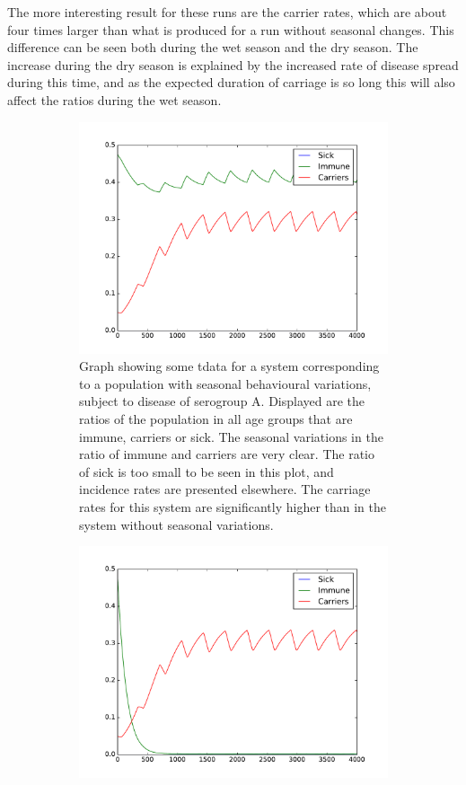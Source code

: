 \documentclass[10pt,a4paper]{article}
\begin{document}
The more interesting result for these runs are the carrier rates, which are about four times larger than what is produced for a run without seasonal changes. This difference can be seen both during the wet season and the dry season. The increase during the dry season is explained by the increased rate of disease spread during this time, and as the expected duration of carriage is so long this will also affect the ratios during the wet season.

\begin{figure}
	\centering
	\begin{subfigure}{0.45\textwidth}
		\includegraphics[width=\textwidth]{figures/disease_endemic_2pop_A}
		\caption{Graph showing some tdata for a system corresponding to a population with seasonal behavioural variations, subject to disease of serogroup A. Displayed are the ratios of the population in all age groups that are immune, carriers or sick. The seasonal variations in the ratio of immune and carriers are very clear. The ratio of sick is too small to be seen in this plot, and incidence rates are presented elsewhere. The carriage rates for this system are significantly higher than in the system without seasonal variations.} \label{fig:results:seasonal_disease_A}
	\end{subfigure}
	\begin{subfigure}{0.45\textwidth}
		\includegraphics[width=\textwidth]{figures/disease_endemic_2pop_W135}

\end{subfigure}
\end{figure}
\end{document}
